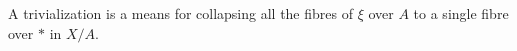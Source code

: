 A trivialization is a means for collapsing all the fibres of $\xi$ over $A$ to a single fibre over $*$ in $X/A$.
